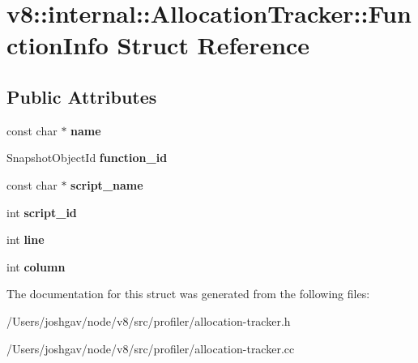\hypertarget{structv8_1_1internal_1_1_allocation_tracker_1_1_function_info}{}\section{v8\+:\+:internal\+:\+:Allocation\+Tracker\+:\+:Function\+Info Struct Reference}
\label{structv8_1_1internal_1_1_allocation_tracker_1_1_function_info}
\subsection*{Public Attributes}
\begin{DoxyCompactItemize}
\item 
const char $\ast$ {\bfseries name}\hypertarget{structv8_1_1internal_1_1_allocation_tracker_1_1_function_info_ae33f02d99a3e461828e2656809c77b2f}{}\label{structv8_1_1internal_1_1_allocation_tracker_1_1_function_info_ae33f02d99a3e461828e2656809c77b2f}

\item 
Snapshot\+Object\+Id {\bfseries function\+\_\+id}\hypertarget{structv8_1_1internal_1_1_allocation_tracker_1_1_function_info_a5ba77f100a28524f998ba3efd87771f4}{}\label{structv8_1_1internal_1_1_allocation_tracker_1_1_function_info_a5ba77f100a28524f998ba3efd87771f4}

\item 
const char $\ast$ {\bfseries script\+\_\+name}\hypertarget{structv8_1_1internal_1_1_allocation_tracker_1_1_function_info_a5e617e59a73c7aeb154eb48504f1e879}{}\label{structv8_1_1internal_1_1_allocation_tracker_1_1_function_info_a5e617e59a73c7aeb154eb48504f1e879}

\item 
int {\bfseries script\+\_\+id}\hypertarget{structv8_1_1internal_1_1_allocation_tracker_1_1_function_info_a3a8b62dc5e0a9adac5805d16cdebd54a}{}\label{structv8_1_1internal_1_1_allocation_tracker_1_1_function_info_a3a8b62dc5e0a9adac5805d16cdebd54a}

\item 
int {\bfseries line}\hypertarget{structv8_1_1internal_1_1_allocation_tracker_1_1_function_info_ac110826fbee56f72da27e835ec5b5150}{}\label{structv8_1_1internal_1_1_allocation_tracker_1_1_function_info_ac110826fbee56f72da27e835ec5b5150}

\item 
int {\bfseries column}\hypertarget{structv8_1_1internal_1_1_allocation_tracker_1_1_function_info_a71c34c3ca4aac838c46922665be8c856}{}\label{structv8_1_1internal_1_1_allocation_tracker_1_1_function_info_a71c34c3ca4aac838c46922665be8c856}

\end{DoxyCompactItemize}


The documentation for this struct was generated from the following files\+:\begin{DoxyCompactItemize}
\item 
/\+Users/joshgav/node/v8/src/profiler/allocation-\/tracker.\+h\item 
/\+Users/joshgav/node/v8/src/profiler/allocation-\/tracker.\+cc\end{DoxyCompactItemize}
